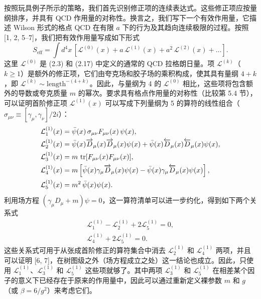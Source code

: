 按照玩具例子所示的策略，我们首先识别修正项的连续表达式。这些修正项应按量纲排序，并具有 QCD 作用量的对称性。换言之，我们写下一个有效作用量，它描述 Wilson 形式的格点 QCD 在有限 $a$ 下的行为及其趋向连续极限的过程。按照 [1, 2, 5--7]，我们把有效作用量写成如下形式
\begin{equation}
  S_{\mathrm{eff}} = \int d^4x\,
    \left[\mathcal{L}^{(0)}(x) + a\,\mathcal{L}^{(1)}(x)
    + a^2\,\mathcal{L}^{(2)}(x) + \ldots\right] .
\end{equation}
这里 $\mathcal{L}^{(0)}$ 是 (2.3) 和 (2.17) 中定义的通常的 QCD 拉格朗日量。项 $\mathcal{L}^{(k)}$（$k \geq 1$）是额外的修正项，它们由夸克场和胶子场的乘积构成，使其具有量纲 $4+k$，即 $\mathcal{L}^{(k)} \sim \mathrm{length}^{-(4+k)}$。因此，与量纲为 4 的 $\mathcal{L}^{(0)}$ 相比，这些项将包含额外的导数或夸克质量 $m$ 的幂次。要求具有格点作用量的对称性（比较第 5.4 节），可以证明首阶修正项 $\mathcal{L}^{(1)}(x)$ 可以写成下列量纲为 5 的算符的线性组合（$\sigma_{\mu\nu} \equiv [\gamma_\mu,\gamma_\nu]/2i$）：
\begin{align}
  \mathcal{L}^{(1)}_1(x)
  &= \bar\psi(x)\,\sigma_{\mu\nu}F_{\mu\nu}(x)\,\psi(x) , \nonumber\\
  \mathcal{L}^{(1)}_2(x)
  &= \bar\psi(x)\overrightarrow{D}_\mu(x)\overrightarrow{D}_\mu(x)\psi(x)
   + \bar\psi(x)\overleftarrow{D}_\mu(x)\overleftarrow{D}_\mu(x)\psi(x) , \nonumber\\
  \mathcal{L}^{(1)}_3(x)
  &= m\,\operatorname{tr}[F_{\mu\nu}(x)F_{\mu\nu}(x)] , \nonumber\\
  \mathcal{L}^{(1)}_4(x)
  &= m\left[\bar\psi(x)\gamma_\mu\overrightarrow{D}_\mu(x)\psi(x)
   - \bar\psi(x)\gamma_\mu\overleftarrow{D}_\mu(x)\psi(x)\right] , \nonumber\\
  \mathcal{L}^{(1)}_5(x)
  &= m^2\,\bar\psi(x)\psi(x) .
\end{align}
利用场方程 $(\gamma_\mu D_\mu + m)\psi = 0$，这一算符清单可以进一步约化，得到如下两个关系式
\begin{gather}
  \mathcal{L}^{(1)}_1 - \mathcal{L}^{(1)}_2 + 2\mathcal{L}^{(1)}_5 = 0 ,
  \nonumber\\
  \mathcal{L}^{(1)}_4 + 2\mathcal{L}^{(1)}_5 = 0 .
\end{gather}
这些关系式可用于从张成首阶修正的算符集合中消去 $\mathcal{L}^{(1)}_2$ 和 $\mathcal{L}^{(1)}_4$ 两项，并且可以证明 [6, 7]，在树图级之外（场方程成立之处）这一结论也成立。因此，只使用 $\mathcal{L}^{(1)}_1$、$\mathcal{L}^{(1)}_3$ 和 $\mathcal{L}^{(1)}_5$ 这些项就够了。其中两项 $\mathcal{L}^{(1)}_3$ 和 $\mathcal{L}^{(1)}_5$ 在相差某个因子的意义下已经存在于原来的作用量中，因此可以通过重新定义裸参数 $m$ 和 $g$（或 $\beta = 6/g^2$）来考虑它们。


